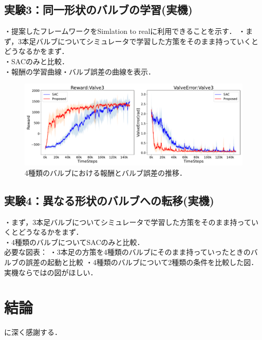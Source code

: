 \documentclass[dvipdfmx]{ampbt_nomag}
\begin{document}
\subsection{実験3：同一形状のバルブの学習(実機)}
・提案したフレームワークをSimlation to realに利用できることを示す．
・まず，3本足バルブについてシミュレータで学習した方策をそのまま持っていくとどうなるかをまず．\\
・SACのみと比較．\\
・報酬の学習曲線・バルブ誤差の曲線を表示．

\begin{figure}[H]
  \centering
  \includegraphics[width=16cm]
       {asset/img/HardwareTurn180.pdf}
  \caption{4種類のバルブにおける報酬とバルブ誤差の推移．}
  \label{dclaw_mujoco}
\end{figure}

\subsection{実験4：異なる形状のバルブへの転移(実機)}
・まず，3本足バルブについてシミュレータで学習した方策をそのまま持っていくとどうなるかをまず．\\
・4種類のバルブについてSACのみと比較．\\
必要な図表：
・3本足の方策を4種類のバルブにそのまま持っていったときのバルブの誤差の起動と比較
・4種類のバルブについて2種類の条件を比較した図．\\
実機ならではの図がほしい．

\clearpage
\section{結論}\label{sec-conclusion}



\acknowledgment
に深く感謝する．


\end{document}
